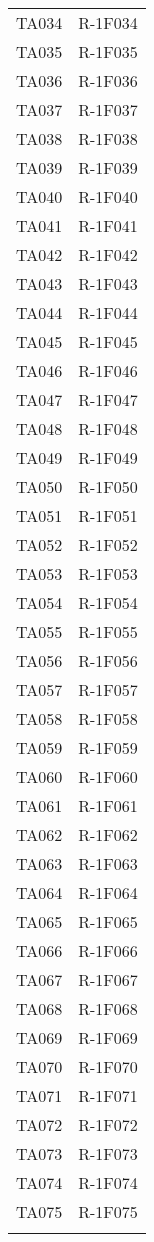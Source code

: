 \begin{tabularx}{\textwidth}{cX}
	TA034 & R-1F034 \\
	TA035 & R-1F035 \\
	TA036 & R-1F036 \\
	TA037 & R-1F037 \\
	TA038 & R-1F038 \\
	TA039 & R-1F039 \\
	TA040 & R-1F040 \\
	TA041 & R-1F041 \\
	TA042 & R-1F042 \\
	TA043 & R-1F043 \\
	TA044 & R-1F044 \\
	TA045 & R-1F045 \\
	TA046 & R-1F046 \\
	TA047 & R-1F047 \\
	TA048 & R-1F048 \\
	TA049 &	R-1F049 \\
	TA050 &	R-1F050 \\
	TA051 &R-1F051\\
	TA052 &	R-1F052 \\
	TA053 & R-1F053 \\
	TA054 &	R-1F054 \\
	TA055 & R-1F055 \\
	TA056 & R-1F056 \\
    TA057 & R-1F057 \\
	TA058 & R-1F058 \\
	TA059 & R-1F059 \\
	TA060 & R-1F060 \\
	TA061 & R-1F061 \\
	TA062 & R-1F062 \\
	TA063 & R-1F063 \\
	TA064 & R-1F064 \\
	TA065 & R-1F065 \\
	TA066 & R-1F066 \\
	TA067 & R-1F067 \\
	TA068 & R-1F068 \\
	TA069 & R-1F069 \\
	TA070 & R-1F070 \\
	TA071 & R-1F071 \\
	TA072 &	R-1F072 \\
	TA073 & R-1F073 \\
	TA074 & R-1F074 \\
	TA075 &	R-1F075 \\
	\rowcolor{white}
	\caption{Tracciamento test Approvazione - requisiti}
	\label{tab:tracciamentotestunità}
\end{tabularx}

